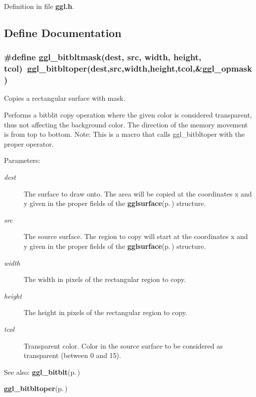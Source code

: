 Definition in file {\bf ggl.h}.

\subsection{Define Documentation}
\subsubsection{\setlength{\rightskip}{0pt plus 5cm}\#define ggl\_\-bitbltmask(dest, src, width, height, tcol)~ggl\_\-bitbltoper(dest,src,width,height,tcol,\&ggl\_\-opmask)}\label{ggl_8h_a6}


Copies a rectangular surface with mask. 

Performs a bitblit copy operation where the given color is considered transparent, thus not affecting the background color. The direction of the memory movement is from top to bottom. Note: This is a macro that calls ggl\_\-bitbltoper with the proper operator.

\begin{Desc}
\item[Parameters:]
\begin{description}
\item[{\em dest}]The surface to draw onto. The area will be copied at the coordinates x and y given in the proper fields of the {\bf gglsurface}{\rm (p.\,\pageref{structgglsurface})} structure. \item[{\em src}]The source surface. The region to copy will start at the coordinates x and y given in the proper fields of the {\bf gglsurface}{\rm (p.\,\pageref{structgglsurface})} structure. \item[{\em width}]The width in pixels of the rectangular region to copy. \item[{\em height}]The height in pixels of the rectangular region to copy. \item[{\em tcol}]Transparent color. Color in the source surface to be considered as transparent (between 0 and 15).\end{description}
\end{Desc}
\begin{Desc}
\item[See also:]{\bf ggl\_\-bitblt}{\rm (p.\,\pageref{ggl_8h_a19})} 

{\bf ggl\_\-bitbltoper}{\rm (p.\,\pageref{ggl_8h_a27})} \end{Desc}


